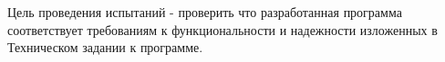 Цель проведения испытаний - проверить 
что разработанная программа соответствует
требованиям к функциональности и надежности  изложенных в Техническом задании к программе.
